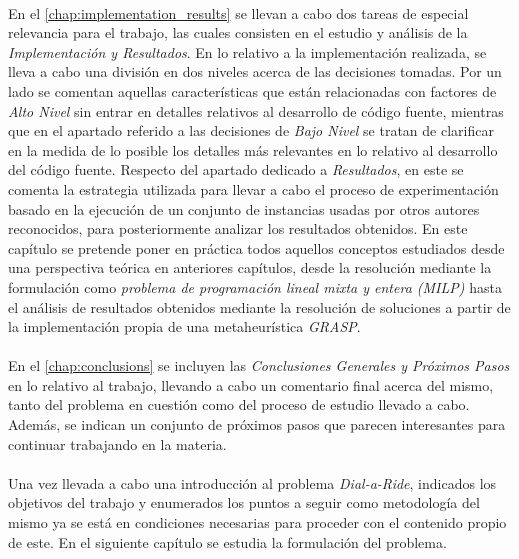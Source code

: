 \documentclass{subfiles}
\begin{document}
      \paragraph{}
      En el \cref{chap:implementation_results} se llevan a cabo dos tareas de especial relevancia para el trabajo, las cuales consisten en el estudio y análisis de la \emph{Implementación y Resultados}. En lo relativo a la implementación realizada, se lleva a cabo una división en dos niveles acerca de las decisiones tomadas. Por un lado se comentan aquellas características que están relacionadas con factores de \emph{Alto Nivel} sin entrar en detalles relativos al desarrollo de código fuente, mientras que en el apartado referido a las decisiones de \emph{Bajo Nivel} se tratan de clarificar en la medida de lo posible los detalles más relevantes en lo relativo al desarrollo del código fuente. Respecto del apartado dedicado a \emph{Resultados}, en este se comenta la estrategia utilizada para llevar a cabo el proceso de experimentación basado en la ejecución de un conjunto de instancias usadas por otros autores reconocidos, para posteriormente analizar los resultados obtenidos. En este capítulo se pretende poner en práctica todos aquellos conceptos estudiados desde una perspectiva teórica en anteriores capítulos, desde la resolución mediante la formulación como \emph{problema de programación lineal mixta y entera (MILP)} hasta el análisis de resultados obtenidos mediante la resolución de soluciones a partir de la implementación propia de una metaheurística \emph{GRASP}.

      \paragraph{}
      En el \cref{chap:conclusions} se incluyen las \emph{Conclusiones Generales y Próximos Pasos} en lo relativo al trabajo, llevando a cabo un comentario final acerca del mismo, tanto del problema en cuestión como del proceso de estudio llevado a cabo. Además, se indican un conjunto de próximos pasos que parecen interesantes para continuar trabajando en la materia.

    \paragraph{}
     Una vez llevada a cabo una introducción al problema \emph{Dial-a-Ride}, indicados los objetivos del trabajo y enumerados los puntos a seguir como metodología del mismo ya se está en condiciones necesarias para proceder con el contenido propio de este. En el siguiente capítulo se estudia la formulación del problema.
\end{document}
